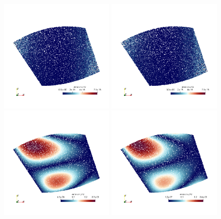 \begin{center}
\includegraphics[width=5.7cm]{images/mappings/biquadratic3/elt2/error_posx2_1}
\includegraphics[width=5.7cm]{images/mappings/biquadratic3/elt2/error_posx2_2}\\
\includegraphics[width=5.7cm]{images/mappings/biquadratic3/elt2/error_posy2_0}
\includegraphics[width=5.7cm]{images/mappings/biquadratic3/elt2/error_posy2_1}

\end{center}
